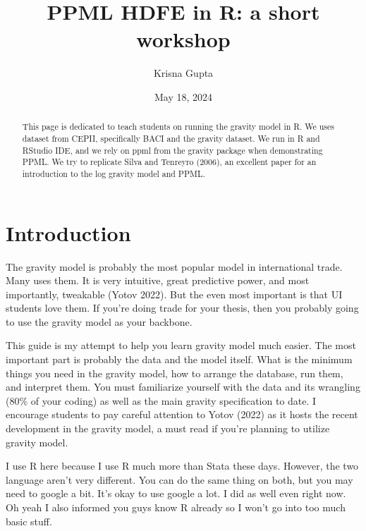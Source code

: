 \documentclass[
  a4paper,
  DIV=11,
  numbers=noendperiod]{scrreprt}
\title{PPML HDFE in R: a short workshop}
\author{Krisna Gupta}
\date{May 18, 2024}
\begin{document}
\maketitle
\begin{abstract}
This page is dedicated to teach students on running the gravity model in
R. We uses dataset from CEPII, specifically BACI and the gravity
dataset. We run in R and RStudio IDE, and we rely on ppml from the
gravity package when demonstrating PPML. We try to replicate Silva and
Tenreyro (2006), an excellent paper for an introduction to the log
gravity model and PPML.
\end{abstract}
\ifdefined\Shaded\renewenvironment{Shaded}{\begin{tcolorbox}[frame hidden, sharp corners, enhanced, borderline west={3pt}{0pt}{shadecolor}, breakable, interior hidden, boxrule=0pt]}{\end{tcolorbox}}\fi

\hypertarget{sec-introduction}{%
\section{Introduction}\label{sec-introduction}}

The gravity model is probably the most popular model in international
trade. Many uses them. It is very intuitive, great predictive power, and
most importantly, tweakable (Yotov 2022). But the even most important is
that UI students love them. If you're doing trade for your thesis, then
you probably going to use the gravity model as your backbone.

This guide is my attempt to help you learn gravity model much easier.
The most important part is probably the data and the model itself. What
is the minimum things you need in the gravity model, how to arrange the
database, run them, and interpret them. You must familiarize yourself
with the data and its wrangling (80\% of your coding) as well as the
main gravity specification to date. I encourage students to pay careful
attention to Yotov (2022) as it hosts the recent development in the
gravity model, a must read if you're planning to utilize gravity model.

I use R here because I use R much more than Stata these days. However,
the two language aren't very different. You can do the same thing on
both, but you may need to google a bit. It's okay to use google a lot. I
did as well even right now. Oh yeah I also informed you guys know R
already so I won't go into too much basic stuff.
\end{document}
